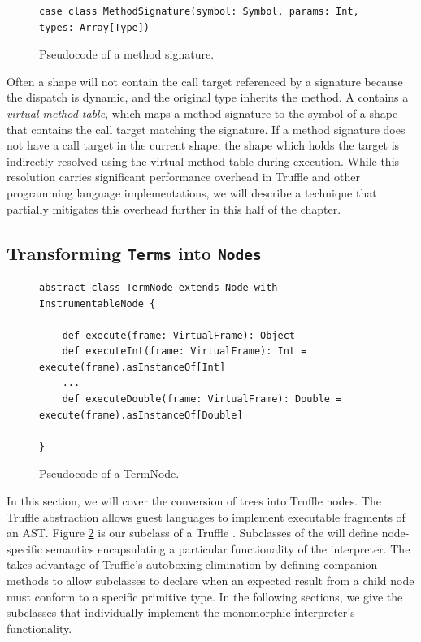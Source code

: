 \begin{figure}[!htb]
\begin{verbatim}
case class MethodSignature(symbol: Symbol, params: Int, types: Array[Type])
\end{verbatim}
\caption{Pseudocode of a method signature.}
\label{impl:method-signature}
\end{figure}

Often a shape will not contain the call target referenced by a signature because the dispatch is dynamic, and the original type inherits the method.
A  contains a \textit{virtual method table}, which maps a method signature to the symbol of a shape that contains the call target matching the signature.
If a method signature does not have a call target in the current shape, the shape which holds the target is indirectly resolved using the virtual method table during execution.
While this resolution carries significant performance overhead in Truffle and other programming language implementations, we will describe a technique that partially mitigates this overhead further in this half of the chapter.

\subsection{Transforming \texttt{Terms} into \texttt{Nodes}}

\begin{figure}[!htb]
\begin{verbatim}
abstract class TermNode extends Node with InstrumentableNode {

	def execute(frame: VirtualFrame): Object 
	def executeInt(frame: VirtualFrame): Int = execute(frame).asInstanceOf[Int]
	...
	def executeDouble(frame: VirtualFrame): Double = execute(frame).asInstanceOf[Double]

}
\end{verbatim}
\caption{Pseudocode of a TermNode.}
\label{impl:term-node}
\end{figure}

In this section, we will cover the conversion of  trees into Truffle nodes.
The Truffle  abstraction allows guest languages to implement executable fragments of an AST.
Figure \ref{impl:term-node} is our subclass of a Truffle .
Subclasses of the  will define node-specific semantics encapsulating a particular functionality of the interpreter.
The  takes advantage of Truffle's autoboxing elimination by defining companion  methods to allow subclasses to declare when an expected result from a child node must conform to a specific primitive type.
In the following sections, we give the subclasses that individually implement the monomorphic interpreter's functionality.

